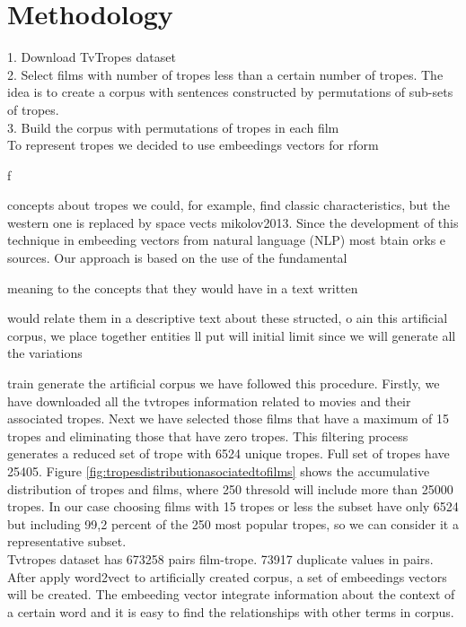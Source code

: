 \documentclass[letterpaper]{article}
\begin{document}
 \section{Methodology}
\label{sec:met}
	
	1. Download TvTropes dataset \\
	2. Select films with number of tropes less than a certain number of tropes. The idea is to create a corpus with sentences constructed by permutations of sub-sets of tropes. \\
	3. Build the corpus with permutations of tropes in each film \\


	To represent tropes we decided to use embeedings vectors for
rform

f

        concepts about tropes we could, for example, find classic
characteristics, but the western one is replaced by space
vects
{mikolov2013}. Since the development of this technique in
        embeeding vectors from natural language (NLP) most
btain
orks
e
 sources. Our approach is based on the use of the fundamental

       meaning to the concepts that they would have in a text written

       would relate them in a descriptive text about these
structed,
o
ain this artificial corpus, we place together entities
ll
put
will
       initial limit since we will generate all the variations

train
generate the artificial corpus we have followed this procedure. Firstly, we have downloaded all the tvtropes information related to movies and their associated tropes. Next we have selected those films that have a maximum of 15 tropes and eliminating those that have zero tropes. This filtering process generates a reduced set of trope with 6524 unique tropes. Full set of tropes have 25405. Figure  \ref{fig:tropesdistributionasociatedtofilms} shows the accumulative distribution of tropes and films, where 250 thresold will include more than 25000 tropes. In our case choosing films with 15 tropes or less the subset have only 6524 but including 99,2 percent of the 250 most popular tropes, so we can consider it a representative subset.\\
 Tvtropes dataset has 673258 pairs film-trope. 73917 duplicate values in pairs. After apply word2vect to artificially created corpus, a set of embeedings vectors will be created. The embeeding vector integrate information about the context of a certain word and it is easy to find the relationships with other terms in corpus.\\
\end{document}
